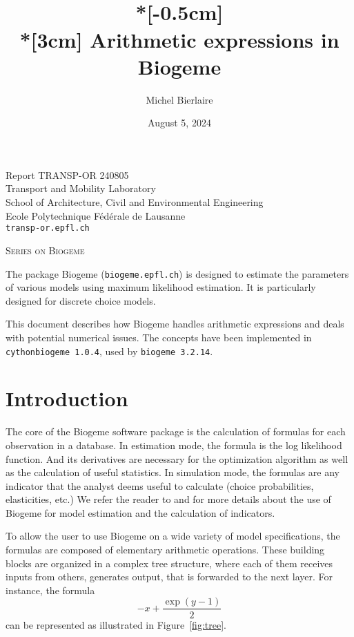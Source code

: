 \documentclass[12pt,a4paper]{article}
\title{
  \vspace{-3cm}
  \epsfig{figure=transp-or.eps,height=2cm}
  \hfill
  \epsfig{figure=epfl,height=1.5cm}   \\*[-0.5cm]
  \mbox{}\hrulefill\mbox{} \\*[3cm] Arithmetic expressions in Biogeme}
\author{Michel Bierlaire}
\date{August 5, 2024}
\begin{document}
\begin{titlepage}
  \pagestyle{empty}

  \maketitle
  \vspace{2cm}

  \begin{center}
    \small Report TRANSP-OR 240805 \\ Transport and Mobility Laboratory \\ School of Architecture, Civil and Environmental Engineering \\ Ecole Polytechnique F\'ed\'erale de Lausanne \\ \verb+transp-or.epfl.ch+
    \begin{center}
      \textsc{Series on Biogeme}
    \end{center}
  \end{center}


  \clearpage
\end{titlepage}


The package Biogeme (\texttt{biogeme.epfl.ch}) is designed to estimate
the parameters of various models using maximum likelihood
estimation. It is particularly designed for discrete choice
models.

This document describes how Biogeme handles arithmetic expressions and
deals with potential numerical issues. The concepts have been
implemented in  \lstinline+cythonbiogeme 1.0.4+, used by
\lstinline+biogeme 3.2.14+.


\section{Introduction}\label{eq:intro}

The core of the Biogeme software package is the calculation of
formulas for each observation in a database. In estimation mode, the
formula is the log likelihood function. And its derivatives are
necessary for the optimization algorithm as well as the calculation of
useful statistics.  In simulation mode, the formulas are any indicator
that the analyst deems useful to calculate (choice probabilities,
elasticities, etc.) We refer the reader to  and
 for more details about the use of Biogeme for
model estimation and the calculation of indicators.


To allow the user to use Biogeme on a wide variety of model
specifications, the formulas are composed of elementary arithmetic
operations. These building blocks are organized in a complex tree structure, where each of them receives inputs from others, generates output, that is forwarded to the next layer.
For instance, the formula
\[
-x + \frac{\exp(y - 1)}{2}
\]
can be represented as illustrated in Figure~\ref{fig:tree}.
\end{document}
